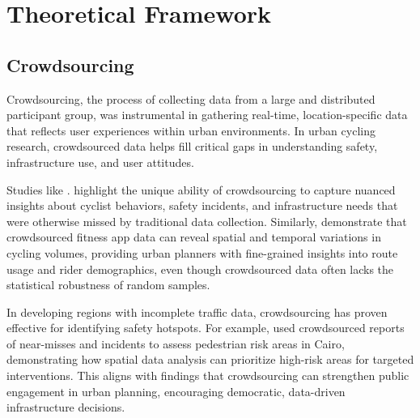 %
%
%                 

\chapter{Theoretical Framework}
\label{sec:theoframework}






\section{Crowdsourcing}
Crowdsourcing, the process of collecting data from a large and distributed participant group, was instrumental in gathering real-time, location-specific data that reflects user experiences within urban environments. In urban cycling research, crowdsourced data helps fill critical gaps in understanding safety, infrastructure use, and user attitudes.

Studies like \citet{Nelson:2020}. highlight the unique ability of crowdsourcing to capture nuanced insights about cyclist behaviors, safety incidents, and infrastructure needs that were otherwise missed by traditional data collection. Similarly, \citet{Jestico:2016} demonstrate that crowdsourced fitness app data can reveal spatial and temporal variations in cycling volumes, providing urban planners with fine-grained insights into route usage and rider demographics, even though crowdsourced data often lacks the statistical robustness of random samples.

In developing regions with incomplete traffic data, crowdsourcing has proven effective for identifying safety hotspots. For example, \citet{Telima:2023} used crowdsourced reports of near-misses and incidents to assess pedestrian risk areas in Cairo, demonstrating how spatial data analysis can prioritize high-risk areas for targeted interventions. This aligns with \cite{Liao:2019} findings that crowdsourcing can strengthen public engagement in urban planning, encouraging democratic, data-driven infrastructure decisions.

